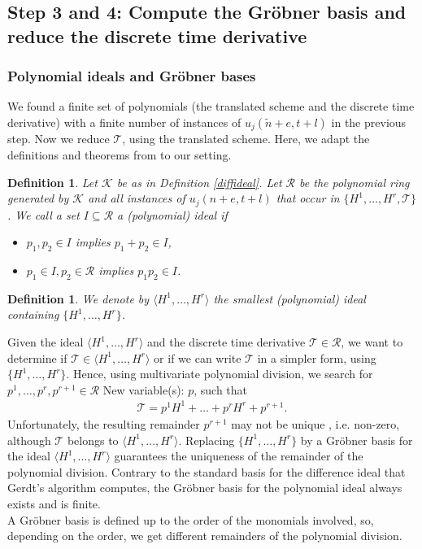 \documentclass[sigconf,twocolumn]{acmart}
\newcommand{\1}{{\chi}}
\numberwithin{equation}{section}
\theoremstyle{thmlemcorr}
\numberwithin{theorem}{section}
\theoremstyle{thmlemcorr*}
\theoremstyle{defi}
\newtheorem{definition}[theorem]{Definition}
\theoremstyle{remexample}
\theoremstyle{ass}
\begin{document}
\subsection*{Step 3 and 4: Compute the Gr{\"o}bner basis and reduce the discrete time derivative}
	\subsubsection*{Polynomial ideals and Gr{\"o}bner bases}\label{polid}
	We found a finite set of polynomials (the translated scheme and the discrete time derivative) with a finite number of instances of \(u_j(\tilde{n}+e,t+l)\) in the previous step. Now we reduce \(\mathcal{T}\), using the translated scheme. Here, we adapt the definitions and theorems from \cite{hibi13} to our setting.
	\begin{definition}
		Let \(\mathcal{K}\) be as in Definition \ref{diffideal}. Let \(\mathcal{R}\) be the polynomial ring generated by \(\mathcal{K}\) and all instances of \(u_j(n+e,t+l)\) that occur in \(\{H^1,\ldots,H^r,\mathcal{T}\}\).
		We call a set \( I\subseteq \mathcal{R}\) a (polynomial) ideal if
		\begin{itemize}
			\item \(p_1,p_2\in I\) implies \(p_1+p_2\in I\),
			\item \(p_1\in I,p_2\in\mathcal{R}\) implies \(p_1p_2\in I\).
		\end{itemize}
	\end{definition}
	\begin{definition}
		We denote by \(\langle H^1,\ldots,H^r\rangle\) the smallest (polynomial) ideal containing \(\{H^1,\ldots,H^r\}\).
	\end{definition}
	Given the ideal \(\langle H^1,\ldots,H^r\rangle\) and the discrete time derivative \(\mathcal{T}\in\mathcal{R}\), we want to determine if \(\mathcal{T}\in\langle H^1,\ldots,H^r\rangle\) or if we can write \(\mathcal{T}\) in a simpler form, using \(\{H^1,\ldots,H^r\}\).
	Hence, using multivariate polynomial division, we search for \(p^1,\ldots,p^r,p^{r+1}\in\mathcal{R}\)
{\color{blue} New variable(s): \(p\),  }
 such that
	\begin{gather*}
		\mathcal{T}=p^1H^1+\ldots+p^rH^r+p^{r+1}.
	\end{gather*}
	Unfortunately, the resulting remainder \(p^{r+1}\) may not be unique \cite[page 14, Example 1.2.3]{hibi13}, i.e. non-zero, although \(\mathcal{T}\) belongs to \(\langle H^1,\ldots,H^r \rangle\). 
	Replacing \(\{H^1,\ldots,H^r\}\) by a Gr{\"o}bner basis for the ideal \(\langle H^1,\ldots,H^r \rangle\) guarantees the uniqueness of the remainder of the polynomial division. 
	Contrary to the standard basis for the difference ideal that Gerdt's algorithm computes, the Gr{\"o}bner basis for the polynomial ideal always exists and is finite.\\
	A Gr{\"o}bner basis is defined up to the order of the monomials involved, so, depending on the order, we get different remainders of the polynomial division.
\end{document}
